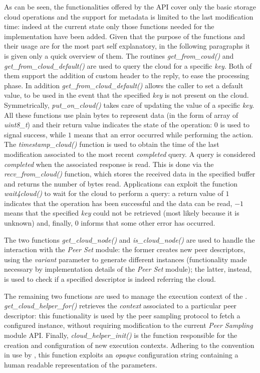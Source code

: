 As can be seen, the functionalities offered by the API cover only the
basic storage cloud operations and the support for metadata is limited to the
last modification time: indeed at the current state only those
functions needed for the \cloudcast implementation have been
added.
Given that the purpose of the functions and their usage are for the most
part self explanatory, in the following paragraphs it is given
only a quick overview of them.
The routines \emph{get\_from\_coud()} and
\emph{get\_from\_cloud\_default()} are used to
query the cloud for a specific \emph{key}. Both of them support the
addition of custom header to the reply, to ease the processing
phase. In addition \emph{get\_from\_cloud\_default()} allows the caller to
set a default value, to be used in the event that the specified
\emph{key} is not present on the cloud. Symmetrically,
\emph{put\_on\_cloud()} takes care of updating the value of a specific
\emph{key}. All these functions use plain bytes to represent
data (in the form of array of \emph{uint8\_t}) and their return
value indicates the state of the operation: $0$ is used to signal
success, while $1$ means that an error occurred while performing the
action. The \emph{timestamp\_cloud()} function is used to obtain the time
of the last modification associated to the most recent
\emph{completed} query. A query is considered \emph{completed}
when the associated response is read. This is done via the
\emph{recv\_from\_cloud()} function, which stores the received data in the
specified buffer and returns the number of bytes read. Applications can
exploit the function \emph{wait4cloud()} to wait for the cloud to
perform a query: a return value of $1$ indicates that the
operation has been successful and the data can be read, $-1$ means that the
specified \emph{key} could not be retrieved (most likely because it is
unknown) and, finally, $0$ informs that some other error has occurred.

The two functions \emph{get\_cloud\_node()} and \emph{is\_cloud\_node()} are used
to handle the interaction with the \textit{Peer Set} module: the
former creates new peer descriptors, using the \emph{variant}
parameter to generate different instances (functionality made
necessary by implementation details of the \textit{Peer Set} module);
the latter, instead, is used to check if a specified descriptor is
indeed referring the cloud.

The remaining two functions are used to manage the execution
  context of the \cloudhelper. \textit{get\_cloud\_helper\_for()} retrieves the
\emph{context} associated to a particular peer descriptor: this
functionality is used by the \cloudcast peer sampling protocol to
fetch a configured \cloudhelper instance, without requiring
modification to the current \grapes \textit{Peer Sampling} module
API. Finally, \textit{cloud\_helper\_init()} is the function
responsible for the
creation and configuration of new \cloudhelper execution
  contexts. Adhering to the convention in use by \grapes, this function
exploits an \textit{opaque} configuration string containing a
human readable representation of the parameters.

